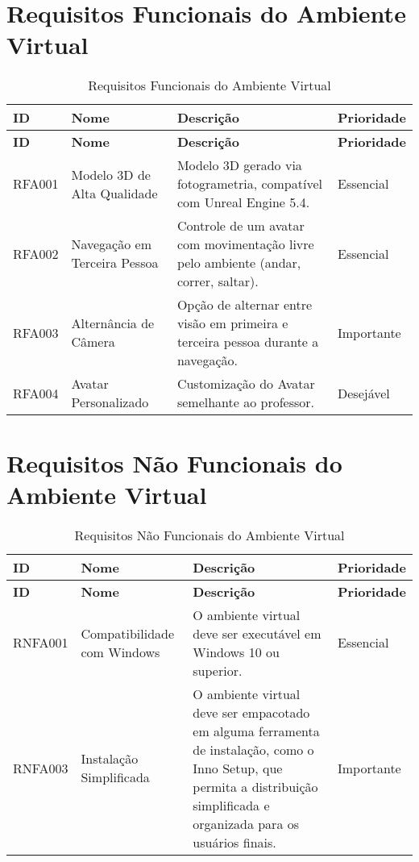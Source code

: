 
\section{Requisitos Funcionais do Ambiente Virtual}\label{ap:requisitos-ambiente-table}
\begin{longtable}{|l|l|p{6cm}|l|}
    \caption{Requisitos Funcionais do Ambiente Virtual}
    \label{tab:requisitos-funcionais-ambiente}
    \hline
    \textbf{ID} & \textbf{Nome} & \textbf{Descrição} & \textbf{Prioridade} \\ \hline
    \endfirsthead
    \hline
    \textbf{ID} & \textbf{Nome} & \textbf{Descrição} & \textbf{Prioridade} \\ \hline
    \endhead
    RFA001 & Modelo 3D de Alta Qualidade & Modelo 3D gerado via fotogrametria, compatível com Unreal Engine 5.4. & Essencial \\ \hline
    RFA002 & Navegação em Terceira Pessoa & Controle de um avatar com movimentação livre pelo ambiente (andar, correr, saltar). & Essencial \\ \hline
    RFA003 & Alternância de Câmera & Opção de alternar entre visão em primeira e terceira pessoa durante a navegação. & Importante \\ \hline
    RFA004 & Avatar Personalizado & Customização do Avatar semelhante ao professor. & Desejável \\ \hline
\end{longtable}

\section{Requisitos Não Funcionais do Ambiente Virtual}\label{ap:requisitos-nao-funcionais-ambiente}
\begin{longtable}{|l|l|p{6cm}|l|}
    \caption{Requisitos Não Funcionais do Ambiente Virtual}
    \label{tab:requisitos-nao-funcionais-ambiente}
    \hline
    \textbf{ID} & \textbf{Nome} & \textbf{Descrição} & \textbf{Prioridade} \\ \hline
    \endfirsthead
    \hline
    \textbf{ID} & \textbf{Nome} & \textbf{Descrição} & \textbf{Prioridade} \\ \hline
    \endhead
    RNFA001 & Compatibilidade com Windows & O ambiente virtual deve ser executável em Windows 10 ou superior. & Essencial \\ \hline
    RNFA003 & Instalação Simplificada & O ambiente virtual deve ser empacotado em alguma ferramenta de instalação, como o Inno Setup, que permita a distribuição simplificada e organizada para os usuários finais. & Importante \\ \hline
\end{longtable}